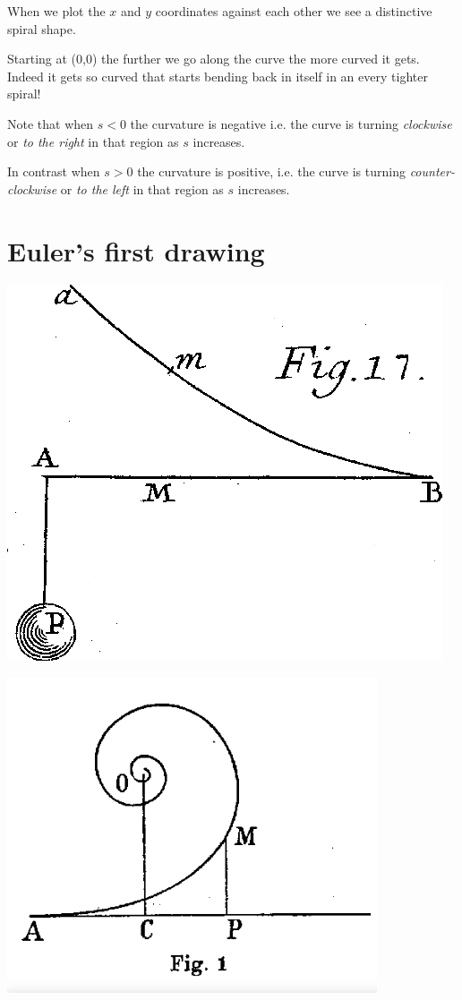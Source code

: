 \documentclass[]{article} %
\theoremstyle{definition}
\theoremstyle{theorem}
\begin{document}
When we plot the $x$ and $y$ coordinates against each other we see a distinctive spiral shape. 

Starting at (0,0) the further we go along the curve the more curved it gets. Indeed it gets so curved that starts bending back in itself in an every tighter spiral!

Note that when $s<0$ the curvature is negative i.e. the curve is turning \emph{clockwise} or \emph{to the right} in that region as $s$ increases. 

In contrast when $s>0$ the curvature is positive, i.e. the curve is turning \emph{counter-clockwise} or \emph{to the left} in that region as $s$ increases.


\section{Euler's first drawing}
\begin{tcolorbox}
	\begin{minipage}{\textwidth}
		\centering
		\includegraphics[width=.5\linewidth]{Euler_first_drawing.png}
		\label{fig:test1}
	\end{minipage}
	\begin{minipage}{\textwidth}
		\centering
		\includegraphics[width=0.5\linewidth]{Euler second drawing.png}
		\label{fig:test2}
	\end{minipage}

\end{tcolorbox}
\end{document}
